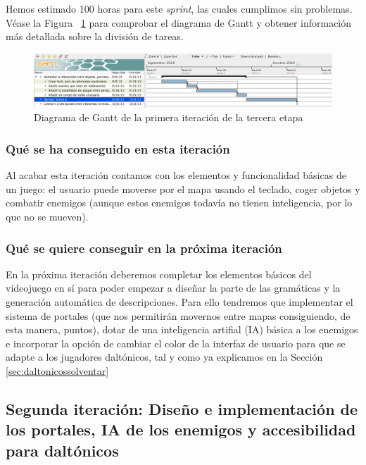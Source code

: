 \noindent Hemos estimado 100 horas para este \textit{sprint}, las cuales cumplimos sin problemas. Véase la Figura ~\ref{fig:sec3it1} para comprobar el diagrama de Gantt y obtener información más detallada sobre la división de tareas.

\begin{figure}
    \includegraphics[width=\textwidth,height=\textheight,keepaspectratio]{./img/sec3it1.png}
  \caption{Diagrama de Gantt de la primera iteración de la tercera etapa}
  \label{fig:sec3it1}
\end{figure}

\subsubsection{Qué se ha conseguido en esta iteración}

Al acabar esta iteración contamos con los elementos y funcionalidad básicas de un juego: el usuario puede moverse por el mapa usando el teclado, coger objetos y combatir enemigos (aunque estos enemigos todavía no tienen inteligencia, por lo que no se mueven).

\subsubsection{Qué se quiere conseguir en la próxima iteración}

En la próxima iteración deberemos completar los elementos básicos del videojuego en sí para poder empezar a diseñar la parte de las gramáticas y la generación automática de descripciones. Para ello tendremos que implementar el sistema de portales (que nos permitirán movernos entre mapas consiguiendo, de esta manera, puntos), dotar de una inteligencia artifial (IA) básica a los enemigos e incorporar la opción de cambiar el color de la interfaz de usuario para que se adapte a los jugadores daltónicos, tal y como ya explicamos en la Sección \ref{sec:daltonicossolventar}

\subsection{Segunda iteración: Diseño e implementación de los portales, IA de los enemigos y accesibilidad para daltónicos}

